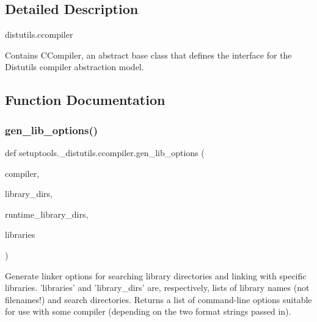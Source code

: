 \subsection{Detailed Description}
\begin{DoxyVerb}distutils.ccompiler

Contains CCompiler, an abstract base class that defines the interface
for the Distutils compiler abstraction model.\end{DoxyVerb}
 

\subsection{Function Documentation}
\mbox{\label{namespacesetuptools_1_1__distutils_1_1ccompiler_a3c8fe797e125f47bef62aae7ab76aad7}} 
\subsubsection{\texorpdfstring{gen\+\_\+lib\+\_\+options()}{gen\_lib\_options()}}
{\footnotesize\ttfamily def setuptools.\+\_\+distutils.\+ccompiler.\+gen\+\_\+lib\+\_\+options (\begin{DoxyParamCaption}\item[{}]{compiler,  }\item[{}]{library\+\_\+dirs,  }\item[{}]{runtime\+\_\+library\+\_\+dirs,  }\item[{}]{libraries }\end{DoxyParamCaption})}

\begin{DoxyVerb}Generate linker options for searching library directories and
linking with specific libraries.  'libraries' and 'library_dirs' are,
respectively, lists of library names (not filenames!) and search
directories.  Returns a list of command-line options suitable for use
with some compiler (depending on the two format strings passed in).
\end{DoxyVerb}
 \mbox{\label{namespacesetuptools_1_1__distutils_1_1ccompiler_a61e9065d3f34f4c2f88deb2eda16d537}} 
